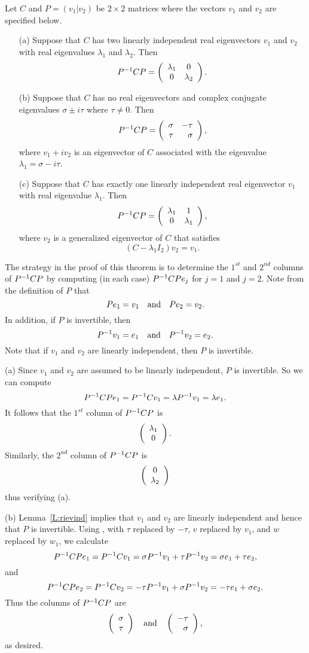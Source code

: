 \begin{thm}  \label{T:putinform}
Let $C$ and $P=(v_1|v_2)$ be $2\times 2$ matrices where the vectors
$v_1$ and $v_2$ are specified below.
\begin{itemize}
\item[(a)]	Suppose that $C$ has two linearly independent
real eigenvectors $v_1$ and $v_2$ with real eigenvalues $\lambda_1$
and $\lambda_2$.  Then
\[
P^{-1} CP = \left(\begin{array}{cc} \lambda_1 & 0\\ 0 &\lambda_2\end{array}\right).
\]

\item[(b)]	Suppose that $C$ has no real eigenvectors and
complex conjugate eigenvalues $\sigma\pm i\tau$ where
$\tau\neq 0$.  Then
\[
P^{-1} CP = \left(\begin{array}{rr} \sigma & -\tau\\ \tau &\sigma\end{array}\right),
\]
where $v_1 + iv_2$ is an eigenvector of $C$ associated with the
eigenvalue $\lambda_1=\sigma-i\tau$.

\item[(c)]	Suppose that $C$ has exactly one linearly
independent real eigenvector $v_1$ with real eigenvalue $\lambda_1$.
Then
\[
P^{-1} CP = \left(\begin{array}{cc} \lambda_1 & 1\\ 0 &\lambda_1\end{array}\right),
\]
where  $v_2$ is a generalized eigenvector of $C$ that satisfies
\begin{equation}  \label{e:Cw=lw+v}
(C-\lambda_1 I_2) v_2 =  v_1.
\end{equation}

\end{itemize}
\end{thm}

\proof
The strategy in the proof of this theorem is to determine the
$1^{st}$ and $2^{nd}$ columns of $P^{-1} CP$ by computing (in each case)
$P^{-1} CPe_j$ for $j=1$ and $j=2$.  Note from the definition of $P$
that
\[
Pe_1 = v_1 \quad\mbox{and}\quad Pe_2 = v_2.
\]
In addition, if $P$ is invertible, then
\[
P^{-1} v_1 = e_1 \quad\mbox{and}\quad P^{-1} v_2 = e_2.
\]
Note that if $v_1$ and $v_2$ are linearly independent, then $P$ is invertible.

(a) \quad Since $v_1$ and $v_2$ are assumed to be linearly independent,
$P$ is invertible.  So we can compute
\[
P^{-1} CPe_1 = P^{-1} C v_1 = \lambda P^{-1} v_1 = \lambda e_1.
\]
It follows that the $1^{st}$ column of $P^{-1} CP$	is
\[
\left(\begin{array}{c} \lambda_1 \\ 0\end{array}\right).
\]
Similarly, the $2^{nd}$ column of $P^{-1} CP$ is
\[
\left(\begin{array}{c} 0 \\ \lambda_2\end{array}\right)
\]
thus verifying (a).

(b) \quad  Lemma~\ref{L:rievind} implies that $v_1$ and $v_2$ are linearly
independent and hence that $P$ is invertible.  Using ,
with $\tau$ replaced by $-\tau$, $v$ replaced by $v_1$, and $w$ replaced by
$w_1$, we calculate
\[
P^{-1} CPe_1 = P^{-1} Cv_1 = \sigma P^{-1} v_1 + \tau P^{-1} v_2
= \sigma e_1 + \tau e_2,
\]
and
\[
P^{-1} CPe_2 = P^{-1} Cv_2 = -\tau P^{-1} v_1 + \sigma P^{-1} v_2
= -\tau e_1 + \sigma e_2.
\]
Thus the columns of $P^{-1} CP$ are
\[
\left(\begin{array}{r} \sigma \\ \tau\end{array}\right) \quad\mbox{and}\quad \left(\begin{array}{r} -\tau \\ \sigma\end{array}\right),
\]
as desired.


